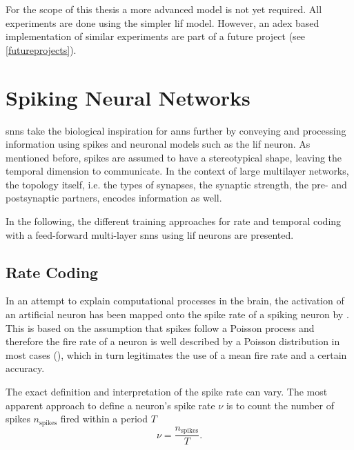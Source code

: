 For the scope of this thesis a more advanced model is not yet required. All experiments are done using the simpler \gls{lif} model. However, an \gls{adex} based implementation of similar experiments are part of a future project (see \cref{futureprojects}).

\section{Spiking Neural Networks}
\label{neuralcoding}

\Glspl{snn} take the biological inspiration for \glspl{ann} further by conveying and processing information using spikes and neuronal models such as the \gls{lif} neuron. As mentioned before, spikes are assumed to have a stereotypical shape, leaving the temporal dimension to communicate. In the context of large multilayer networks, the topology itself, i.e. the types of synapses, the synaptic strength, the pre- and postsynaptic partners, encodes information as well.

In the following, the different training approaches for rate and temporal coding with a feed-forward multi-layer \glspl{snn} using \gls{lif} neurons are presented.

\subsection{Rate Coding}
\label{ratecoding}
In an attempt to explain computational processes in the brain, the activation of an artificial neuron has been mapped onto the spike rate of a spiking neuron by \citealp{rieke1999spikes}. This is based on the assumption that spikes follow a Poisson process and therefore the fire rate of a neuron is well described by a Poisson distribution in most cases (\citealp{averbeck2009poisson}), which in turn legitimates the use of a mean fire rate and a certain accuracy.

The exact definition and interpretation of the spike rate can vary. The most apparent approach to define a neuron's spike rate $\nu$ is to count the number of spikes $n_\text{spikes}$ fired within a period $T$
\begin{equation*}
\nu = \frac{n_\text{spikes}}{T}.
\label{eqratecoding}
\end{equation*}

